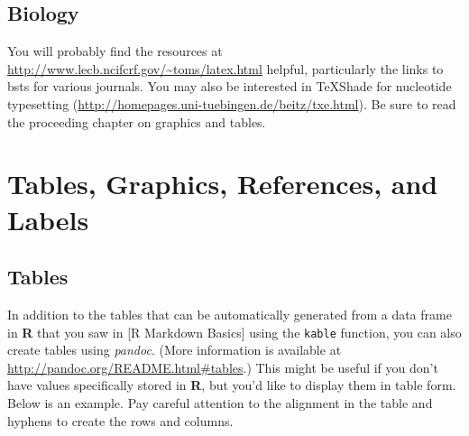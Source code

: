 \documentclass[12pt,twoside]{reedthesis}
\begin{document}
  \section{Biology}\label{biology}
  
  You will probably find the resources at
  \url{http://www.lecb.ncifcrf.gov/~toms/latex.html} helpful, particularly
  the links to bsts for various journals. You may also be interested in
  TeXShade for nucleotide typesetting
  (\url{http://homepages.uni-tuebingen.de/beitz/txe.html}). Be sure to
  read the proceeding chapter on graphics and tables.
  
  \chapter{Tables, Graphics, References, and Labels}\label{ref-labels}
  
  \section{Tables}\label{tables}
  
  In addition to the tables that can be automatically generated from a
  data frame in \textbf{R} that you saw in {[}R Markdown Basics{]} using
  the \texttt{kable} function, you can also create tables using
  \emph{pandoc}. (More information is available at
  \url{http://pandoc.org/README.html\#tables}.) This might be useful if
  you don't have values specifically stored in \textbf{R}, but you'd like
  to display them in table form. Below is an example. Pay careful
  attention to the alignment in the table and hyphens to create the rows
  and columns.
  
\end{document}
